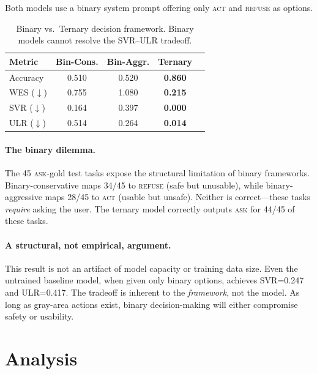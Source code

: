 \documentclass{article}
\newcommand{\act}{\textcolor{actcolor}{\textsc{act}}}
\newcommand{\ask}{\textcolor{askcolor}{\textsc{ask}}}
\newcommand{\refuse}{\textcolor{refusecolor}{\textsc{refuse}}}
\begin{document}
Both models use a binary system prompt offering only \act{} and \refuse{} as options.

\begin{table}[h]
\centering
\caption{Binary vs.\ Ternary decision framework. Binary models cannot resolve the SVR--ULR tradeoff.}
\label{tab:binary-vs-ternary}
\small
\begin{tabular}{lcccc}
\toprule
\textbf{Metric} & \textbf{Bin-Cons.} & \textbf{Bin-Aggr.} & \textbf{Ternary} \\
\midrule
Accuracy & 0.510 & 0.520 & \textbf{0.860} \\
WES ($\downarrow$) & 0.755 & 1.080 & \textbf{0.215} \\
SVR ($\downarrow$) & 0.164 & 0.397 & \textbf{0.000} \\
ULR ($\downarrow$) & 0.514 & 0.264 & \textbf{0.014} \\
\bottomrule
\end{tabular}
\end{table}

\paragraph{The binary dilemma.} The 45 \ask{}-gold test tasks expose the structural limitation of binary frameworks. Binary-conservative maps 34/45 to \refuse{} (safe but unusable), while binary-aggressive maps 28/45 to \act{} (usable but unsafe). Neither is correct---these tasks \emph{require} asking the user. The ternary model correctly outputs \ask{} for 44/45 of these tasks.

\paragraph{A structural, not empirical, argument.} This result is not an artifact of model capacity or training data size. Even the untrained baseline model, when given only binary options, achieves SVR=0.247 and ULR=0.417. The tradeoff is inherent to the \emph{framework}, not the model. As long as gray-area actions exist, binary decision-making will either compromise safety or usability.


\section{Analysis}
\label{sec:analysis}
\end{document}

